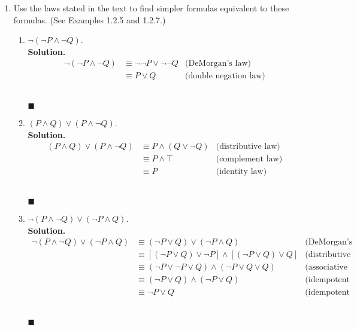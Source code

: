 \documentclass{report}
\newcommand{\sol}{\vspace{1em}\\\textbf{Solution.}\vspace{0.5em}}
\newcommand{\qed}{\ \\\strut\hfill$\blacksquare$\vspace{1em}}
\begin{document}
\begin{enumerate}[leftmargin=*]
\begin{enumerate}
          \end{enumerate}

    \item Use the laws stated in the text to find simpler formulas equivalent to these
          formulas. (See Examples 1.2.5 and 1.2.7.)
          \begin{enumerate}
              \item $\neg(\neg P \wedge \neg Q)$.
                    \sol{}
                    \begin{align*}
                        \neg(\neg P \wedge \neg Q) & \equiv \neg\neg P \vee \neg\neg Q & \text{(DeMorgan's law)}      \\
                                                   & \equiv P \vee Q                   & \text{(double negation law)}
                    \end{align*} \qed

              \item $(P \wedge Q) \vee(P \wedge \neg Q)$.
                    \sol{}
                    \begin{align*}
                        (P \wedge Q) \vee(P \wedge \neg Q) & \equiv P \wedge (Q \vee \neg Q) & \text{(distributive law)} \\
                                                           & \equiv P \wedge \top            & \text{(complement law)}   \\
                                                           & \equiv P                        & \text{(identity law)}
                    \end{align*} \qed

                    \newpage
              \item $\neg(P \wedge \neg Q) \vee(\neg P \wedge Q)$.
                    \sol{}
                    \begin{align*}
                        \neg(P \wedge \neg Q) \vee(\neg P \wedge Q) & \equiv (\neg P \vee Q) \vee(\neg P \wedge Q)                         & \text{(DeMorgan's law)}   \\
                                                                    & \equiv [(\neg P \vee Q) \vee \neg P] \wedge [(\neg P \vee Q) \vee Q] & \text{(distributive law)} \\
                                                                    & \equiv (\neg P \vee \neg P \vee Q) \wedge (\neg P \vee Q \vee Q)     & \text{(associative law)}  \\
                                                                    & \equiv (\neg P \vee Q) \wedge (\neg P \vee Q)                        & \text{(idempotent law)}   \\
                                                                    & \equiv \neg P \vee Q                                                 & \text{(idempotent law)}
                    \end{align*} \qed
          \end{enumerate}


\end{enumerate}
\end{document}
